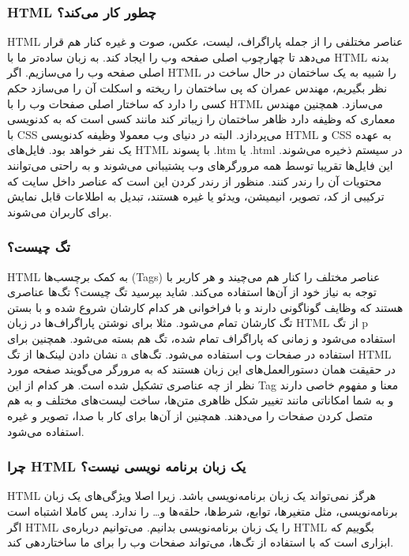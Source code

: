\subsubsection{HTML چطور کار می‌کند؟}
HTML عناصر مختلفی را از جمله پاراگراف، لیست، عکس، صوت و غیره کنار هم قرار می‌دهد تا چهارچوب اصلی صفحه وب را ایجاد کند. به زبان ساده‌تر ما با HTML بدنه اصلی صفحه وب را می‌سازیم.
اگر HTML را شبیه به یک ساختمان در حال ساخت در نظر بگیریم، مهندس عمران که پی ساختمان را ریخته و اسکلت آن را می‌سازد حکم کسی را دارد که ساختار اصلی صفحات وب را با HTML می‌سازد. همچنین مهندس معماری که وظیفه دارد ظاهر ساختمان را زیباتر کند مانند کسی است که به کدنویسی با CSS می‌پردازد.
البته در دنیای وب معمولا وظیفه کدنویسی HTML و CSS به عهده یک نفر خواهد بود. فایل‌‌های HTML با پسوند .htm یا .html در سیستم ذخیره می‌شوند. این فایل‌ها تقریبا توسط همه مرورگرهای وب پشتیبانی می‌شوند و به راحتی می‌توانند محتویات آن را رندر کنند. منظور از رندر کردن این است که عناصر داخل سایت که ترکیبی از کد، تصویر، انیمیشن، ویدئو یا غیره هستند، تبدیل به اطلاعات قابل نمایش برای کاربران می‌شوند.

\subsubsection{تگ چیست؟}
HTML به کمک برچسب‌‌ها (Tags) عناصر مختلف را کنار هم می‌چیند و هر کاربر با توجه به نیاز خود از آن‌ها استفاده می‌کند. شاید بپرسید تگ چیست؟ تگ‌ها عناصری هستند که وظایف گوناگونی دارند و با فراخوانی هر کدام کارشان شروع شده و با بستن تگ کارشان تمام می‌شود. مثلا برای نوشتن پاراگراف‌ها در زبان HTML از تگ p استفاده می‌شود و زمانی که پاراگراف تمام شده، تگ هم بسته می‌شود. همچنین برای نشان دادن لینک‌ها از تگ a استفاده در صفحات وب استفاده می‌شود.
تگ‌های HTML در حقیقت همان دستورالعمل‌های این زبان هستند که به مرورگر می‌گویند صفحه مورد نظر از چه عناصری تشکیل شده است. هر کدام از این Tag معنا و مفهوم خاصی دارند و به شما امکاناتی مانند تغییر شکل ظاهری متن‌ها، ساخت لیست‌های مختلف و به هم متصل کردن صفحات را می‌دهند. همچنین از آن‌ها برای کار با صدا، تصویر و غیره استفاده می‌شود.

\subsubsection{چرا HTML یک زبان برنامه نویسی نیست؟}
HTML
 هرگز نمی‌تواند یک زبان برنامه‌نویسی باشد. زیرا اصلا ویژگی‌های یک زبان برنامه‌نویسی، مثل متغیر‌ها، توابع، شرط‌ها، حلقه‌ها و… را ندارد. پس کاملا اشتباه است اگر HTML را یک زبان برنامه‌نویسی بدانیم. می‌توانیم درباره‌ی HTML بگوییم که ابزاری است که با استفاده از تگ‌ها، می‌تواند صفحات وب را برای ما ساختاردهی کند.

